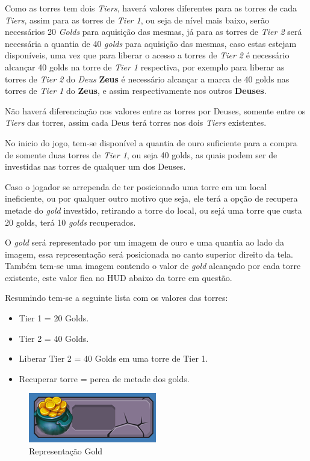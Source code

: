 \documentclass[11pt]{article} %
\begin{document}
Como as torres tem dois \textit{Tiers}, haverá valores diferentes para as torres de cada \textit{Tiers}, assim para as torres de \textit{Tier 1}, ou seja de nível mais baixo, serão necessários 20 \textit{Golds} para aquisição das mesmas, já para as torres de \textit{Tier 2} será necessária a quantia de 40 \textit{golds} para aquisição das mesmas, caso estas estejam disponíveis, uma vez que para liberar o acesso a torres de \textit{Tier 2} é necessário alcançar 40 golds na torre de \textit{Tier 1} respectiva, por exemplo para liberar as torres de \textit{Tier 2} do \textit{Deus} \textbf{Zeus} é necessário alcançar a marca de 40 golds nas torres de \textit{Tier 1} do \textbf{Zeus}, e assim respectivamente nos outros \textbf{Deuses}.

Não haverá diferenciação nos valores entre as torres por Deuses, somente entre os \textit{Tiers} das torres, assim cada Deus terá torres nos dois \textit{Tiers} existentes.
 
No inicio do jogo, tem-se disponível a quantia de ouro suficiente para a compra de somente duas torres de \textit{Tier 1}, ou seja 40 golds, as quais podem ser de investidas nas torres de qualquer um dos Deuses.  

Caso o jogador se arrependa de ter posicionado uma torre em um local ineficiente, ou por qualquer outro motivo que seja, ele terá a opção de recupera metade do \textit{gold} investido, retirando a torre do local, ou sejá uma torre que custa 20 golds, terá 10 \textit{golds} recuperados.
 
 
O \textit{gold} será representado por um imagem de ouro e uma quantia ao lado da imagem, essa representação será posicionada no canto superior direito da tela. Também tem-se uma imagem contendo o valor de \textit{gold} alcançado por cada torre existente, este valor fica no HUD abaixo da torre em questão.

Resumindo tem-se a seguinte lista com os valores das torres:
\begin{itemize}
 \item Tier 1 = 20 Golds.
 \item Tier 2 = 40 Golds.
 \item Liberar Tier 2 = 40 Golds em uma torre de Tier 1.
 \item Recuperar torre = perca de metade dos golds.
\end{itemize} 

\begin{figure}[!htp]
\centering
\includegraphics[scale=1.25]{res/gold.png}
\caption{Representação Gold}
\label{Tela Equip}
\end{figure}
\end{document}
